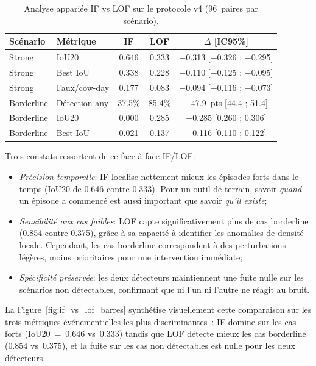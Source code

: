 \FloatBarrier

\begin{table}[H]
    \centering
    \caption{Analyse appariée IF vs LOF sur le protocole v4 (96~paires par scénario).}
    \label{tab:if_lof_ci_v4}
    \small
    \begin{tabular}{llccc}
        \toprule
        \textbf{Scénario} & \textbf{Métrique} & \textbf{IF} & \textbf{LOF}
            & \textbf{$\Delta$ [IC95\%]} \\
        \midrule
        Strong & IoU20 & 0.646 & 0.333 & $-$0.313 [$-$0.326 ; $-$0.295] \\
        Strong & Best IoU & 0.338 & 0.228 & $-$0.110 [$-$0.125 ; $-$0.095] \\
        Strong & Faux/cow-day & 0.177 & 0.083 & $-$0.094 [$-$0.116 ; $-$0.073] \\
        Borderline & Détection any & 37.5\% & 85.4\% & +47.9~pts [44.4 ; 51.4] \\
        Borderline & IoU20 & 0.000 & 0.285 & +0.285 [0.260 ; 0.306] \\
        Borderline & Best IoU & 0.021 & 0.137 & +0.116 [0.110 ; 0.122] \\
        \bottomrule
    \end{tabular}
\end{table}

Trois constats ressortent de ce face-à-face IF/LOF:
\begin{itemize}
    \item \textit{Précision temporelle}: IF localise nettement mieux les épisodes forts
    dans le temps (IoU20 de 0.646 contre 0.333). Pour un outil de terrain, savoir
    \textit{quand} un épisode a commencé est aussi important que savoir \textit{qu'il
    existe};
    \item \textit{Sensibilité aux cas faibles}: LOF capte significativement plus de cas
    borderline (0.854 contre 0.375), grâce à sa capacité à identifier les anomalies de
    densité locale. Cependant, les cas borderline correspondent à des perturbations légères,
    moins prioritaires pour une intervention immédiate;
    \item \textit{Spécificité préservée}: les deux détecteurs maintiennent une fuite nulle
    sur les scénarios non détectables, confirmant que ni l'un ni l'autre ne réagit au bruit.
\end{itemize}

La Figure~\ref{fig:if_vs_lof_barres} synthétise visuellement cette comparaison sur les
trois métriques événementielles les plus discriminantes~: IF domine sur les cas forts
(IoU20~=~0.646 vs~0.333) tandis que LOF détecte mieux les cas borderline
(0.854 vs~0.375), et la fuite sur les cas non détectables est nulle pour les deux
détecteurs.

